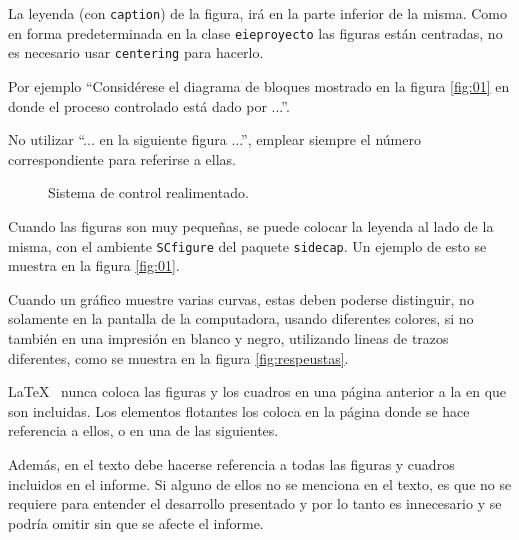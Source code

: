La leyenda (con \texttt{caption}) de la figura, irá en la parte inferior de la misma.  Como en forma predeterminada en la clase \texttt{eieproyecto} las figuras están centradas, no es necesario usar \texttt{centering} para hacerlo.

Por ejemplo ``Considérese el diagrama de bloques mostrado en la figura \ref{fig:01} en donde el proceso controlado está dado por ...''.

No utilizar ``... en la siguiente figura ...'', emplear siempre el número correspondiente para referirse a ellas.

\begin{figure}
\caption{Sistema de control realimentado.} \label{fig:01x}
\end{figure}

Cuando las figuras son muy pequeñas, se puede colocar la leyenda al lado de la misma, con el ambiente \texttt{SCfigure} del paquete \texttt{sidecap}.  Un ejemplo de esto se muestra en la figura \ref{fig:01}.

\begin{SCfigure}
\caption{Lazo de control de un proceso de una entrada y una salida.} \label{fig:01}
\end{SCfigure}

Cuando un gráfico muestre varias curvas, estas deben poderse distinguir, no solamente en la pantalla de la computadora, usando diferentes colores, si no también en una impresión en blanco y negro, utilizando lineas de trazos diferentes, como se muestra en la figura \ref{fig:respeustas}.

\begin{SCfigure}
\caption{Respuesta del circuito simulado, para dos valores de $R_5$.} \label{fig:respeustas}
\end{SCfigure}

\LaTeX~ nunca coloca las figuras y los cuadros en una página anterior a la en que son incluidas.  Los elementos flotantes los coloca en la página donde se hace referencia a ellos, o en una de las siguientes.

Además, en el texto debe hacerse referencia a todas las figuras y cuadros incluidos en el informe.  Si alguno de ellos no se menciona en el texto, es que no se requiere para entender el desarrollo presentado y por lo tanto es innecesario y se podría omitir sin que se afecte el informe.

